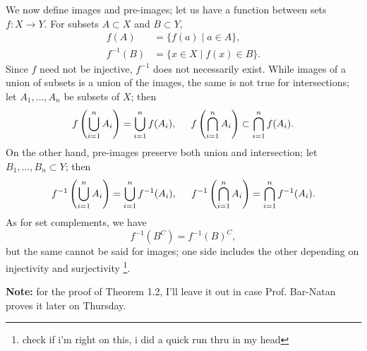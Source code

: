 \noindent We now define images and pre-images; let us have a function between sets $f : X \to Y$. For subsets $A \subset X$ and $B \subset Y$,
\begin{align*}
    f(A) &= \{f(a) \mid a \in A\}, \\
    f^{-1}(B) &= \{x \in X \mid f(x) \in B\}.
\end{align*}
Since $f$ need not be injective, $f^{-1}$ does not necessarily exist. While images of a union of subsets is a union of the images, the same is not true for intersections; let $A_1, \dots, A_n$ be subsets of $X$; then
\[ f\left( \bigcup_{i=1}^n A_i \right) = \bigcup_{i=1}^n f(A_i), \hspace{0.2in} f\left( \bigcap_{i=1}^n A_i \right) \subset \bigcap_{i=1}^n f(A_i). \]
On the other hand, pre-images preserve both union and intersection; let $B_1, \dots, B_n \subset Y$; then
\[ f^{-1}\left( \bigcup_{i=1}^n A_i \right) = \bigcup_{i=1}^n f^{-1}(A_i), \hspace{0.2in} f^{-1}\left( \bigcap_{i=1}^n A_i \right) = \bigcap_{i=1}^n f^{-1}(A_i). \]
As for set complements, we have
\[ f^{-1}(B^C) = f^{-1}(B)^C, \]
but the same cannot be said for images; one side includes the other depending on injectivity and surjectivity \footnote{check if i'm right on this, i did a quick run thru in my head}.

\medskip
\noindent \textbf{Note:} for the proof of Theorem 1.2, I'll leave it out in case Prof. Bar-Natan proves it later on Thursday.